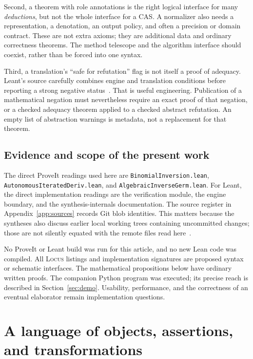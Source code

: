 \documentclass[11pt,letterpaper]{article}
\newcommand{\code}[1]{\nolinkurl{#1}}
\newcommand{\Locus}{\textsc{Locus}}
\theoremstyle{definition}
\theoremstyle{remark}
\begin{document}
Second, a theorem with role annotations is the right logical interface for
many \emph{deductions}, but not the whole interface for a CAS. A normalizer also
needs a representation, a denotation, an output policy, and often a precision
or domain contract. These are not extra axioms; they are additional data and
ordinary correctness theorems. The method telescope and the algorithm interface
should coexist, rather than be forced into one syntax.

Third, a translation's ``safe for refutation'' flag is not itself a proof of
adequacy. Leant's source carefully combines engine and translation conditions
before reporting a strong negative status~\cite{leant-engine}. That is useful
engineering. Publication of a mathematical negation must nevertheless require
an exact proof of that negation, or a checked adequacy theorem applied to a
checked abstract refutation. An empty list of abstraction warnings is metadata,
not a replacement for that theorem.

\subsection{Evidence and scope of the present work}
The direct ProveIt readings used here are \code{BinomialInversion.lean},
\code{AutonomousIteratedDeriv.lean}, and \code{AlgebraicInverseGerm.lean}.
For Leant, the direct implementation readings are the verification module,
the engine boundary, and the synthesis-internals documentation. The source
register in Appendix~\ref{app:sources} records Git blob identities. This matters
because the syntheses also discuss earlier local working trees containing
uncommitted changes; those are not silently equated with the remote files read
here~\cite{synthesis,blueprints,p-binomial,p-ode,p-germ,l-verify,leant-engine,l-internals}.

No ProveIt or Leant build was run for this article, and no new Lean code was
compiled. All \Locus{} listings and implementation signatures are proposed
syntax or schematic interfaces. The mathematical propositions below have
ordinary written proofs. The companion Python program was executed; its
precise reach is described in Section~\ref{sec:demo}. Usability, performance,
and the correctness of an eventual elaborator remain implementation questions.

\section{A language of objects, assertions, and transformations}
\label{sec:surface}
\end{document}
